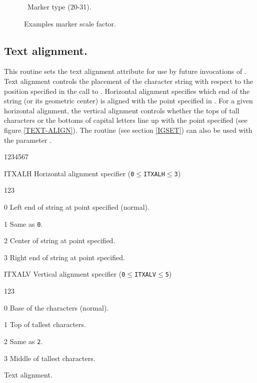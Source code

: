 \begin{figure}[p]
\begin{center}\mbox{}\end{center}
\caption{\HIGZ~Marker type (20-31).}
\label{MARKER-TYPE}

\bigskip

\begin{center}\mbox{}\end{center}
\caption{Examples marker scale factor.}
\label{MARKER-SIZE}
\end{figure}
\clearpage
%
\subsection{Text alignment.}
\Action
This routine sets the text alignment attribute for use by future invocations
of . Text alignment controls the placement of the character string
with respect to the position specified in the call to . Horizontal
alignment specifies which end of the string (or its geometric center) is
aligned with the point specified in . For a given horizontal
alignment, the vertical alignment controls whether the tops of tall characters
or the bottoms of capital letters line up with the point specified (see figure
\ref{TEXT-ALIGN}). The routine  (see section \ref{IGSET}) can also
be used with the parameter .
\Pdesc
\begin{DLtt}{1234567}
\item[ITXALH] Horizontal alignment specifier ({\tt0$\leq$ITXALH$\leq$3})
\begin{DLtt}{123}
\item[0] Left end of string at point specified (normal).
\item[1] Same as {\tt 0}.
\item[2] Center of string at point specified.
\item[3] Right end of string at point specified.
\end{DLtt}
\item[ITXALV] Vertical alignment specifier ({\tt0\(\leq\)ITXALV\(\leq\)5})
\begin{DLtt}{123}
\item[0] Base of the characters (normal).
\item[1] Top of tallest characters.
\item[2] Same as {\tt 2}.
\item[3] Middle of tallest characters.
\end{DLtt}
\end{DLtt}
\begin{Fighere}
\begin{center}\mbox{}\end{center}
\caption{Text alignment.}
\label{TEXT-ALIGN}
\end{Fighere}
%
\newpage%
